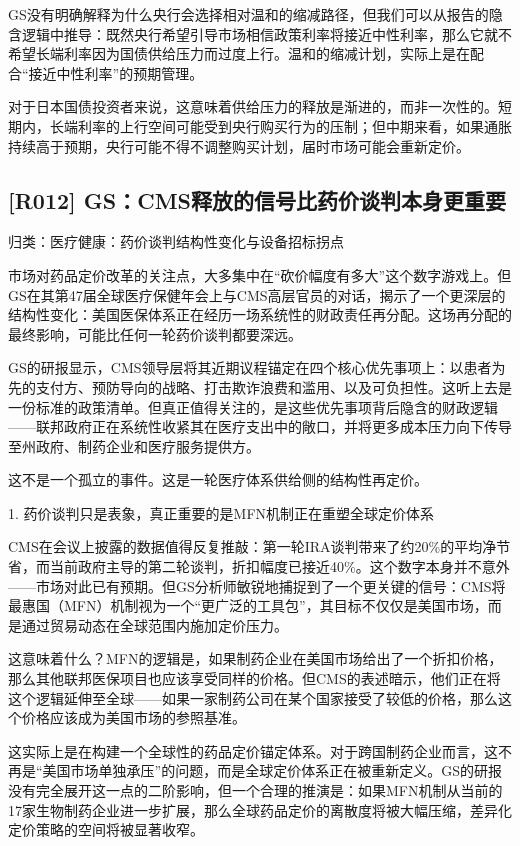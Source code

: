 \documentclass[11pt]{ctexart}
\begin{document}
GS没有明确解释为什么央行会选择相对温和的缩减路径，但我们可以从报告的隐含逻辑中推导：既然央行希望引导市场相信政策利率将接近中性利率，那么它就不希望长端利率因为国债供给压力而过度上行。温和的缩减计划，实际上是在配合“接近中性利率”的预期管理。

对于日本国债投资者来说，这意味着供给压力的释放是渐进的，而非一次性的。短期内，长端利率的上行空间可能受到央行购买行为的压制；但中期来看，如果通胀持续高于预期，央行可能不得不调整购买计划，届时市场可能会重新定价。

\subsection{[R012] GS：CMS释放的信号比药价谈判本身更重要}
{\small\color{refgray}归类：医疗健康：药价谈判结构性变化与设备招标拐点}

市场对药品定价改革的关注点，大多集中在“砍价幅度有多大”这个数字游戏上。但GS在其第47届全球医疗保健年会上与CMS高层官员的对话，揭示了一个更深层的结构性变化：美国医保体系正在经历一场系统性的财政责任再分配。这场再分配的最终影响，可能比任何一轮药价谈判都要深远。

GS的研报显示，CMS领导层将其近期议程锚定在四个核心优先事项上：以患者为先的支付方、预防导向的战略、打击欺诈浪费和滥用、以及可负担性。这听上去是一份标准的政策清单。但真正值得关注的，是这些优先事项背后隐含的财政逻辑——联邦政府正在系统性收紧其在医疗支出中的敞口，并将更多成本压力向下传导至州政府、制药企业和医疗服务提供方。

这不是一个孤立的事件。这是一轮医疗体系供给侧的结构性再定价。

1. 药价谈判只是表象，真正重要的是MFN机制正在重塑全球定价体系

CMS在会议上披露的数据值得反复推敲：第一轮IRA谈判带来了约20\%的平均净节省，而当前政府主导的第二轮谈判，折扣幅度已接近40\%。这个数字本身并不意外——市场对此已有预期。但GS分析师敏锐地捕捉到了一个更关键的信号：CMS将最惠国（MFN）机制视为一个“更广泛的工具包”，其目标不仅仅是美国市场，而是通过贸易动态在全球范围内施加定价压力。

这意味着什么？MFN的逻辑是，如果制药企业在美国市场给出了一个折扣价格，那么其他联邦医保项目也应该享受同样的价格。但CMS的表述暗示，他们正在将这个逻辑延伸至全球——如果一家制药公司在某个国家接受了较低的价格，那么这个价格应该成为美国市场的参照基准。

这实际上是在构建一个全球性的药品定价锚定体系。对于跨国制药企业而言，这不再是“美国市场单独承压”的问题，而是全球定价体系正在被重新定义。GS的研报没有完全展开这一点的二阶影响，但一个合理的推演是：如果MFN机制从当前的17家生物制药企业进一步扩展，那么全球药品定价的离散度将被大幅压缩，差异化定价策略的空间将被显著收窄。
\end{document}
